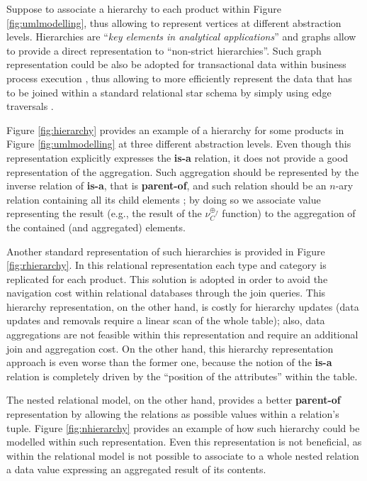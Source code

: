 \begin{example}[label=ex:inaggr]
Suppose to associate a hierarchy to each product within Figure \vref{fig:umlmodelling}, thus allowing to represent vertices at different abstraction levels. Hierarchies are ``\textit{key elements in analytical applications}'' \cite{dwbook} and graphs  allow to provide a direct representation to ``non-strict hierarchies''. Such graph representation could be also be adopted for transactional data within business process execution \cite{PterMicBergami}, thus allowing to more efficiently represent   the data that has to be joined within a standard relational star schema by simply using edge traversals  \cite{Vasilyeva13,preSQLGraph,SQLGraph}.

Figure \ref{fig:hierarchy} provides an example of a hierarchy for some products in Figure \vref{fig:umlmodelling} at three different abstraction levels. Even though this representation explicitly expresses the \textbf{is-a} relation, it does not provide a good representation of the aggregation. Such aggregation should be represented by the inverse relation of \textbf{is-a}, that is \textbf{parent-of}, and such relation should be an $n$-ary relation containing all its child elements \cite{Johnson2011}; by doing so we associate value representing the result (e.g., the result of the $\nu_C^{\oplus_f}$\index{$\nu$} function) to the aggregation of the contained (and aggregated) elements.

Another standard representation of such hierarchies is provided in Figure \ref{fig:rhierarchy}. In this relational representation  each type and category is replicated for each product. This solution is adopted in order to avoid the navigation cost within relational databases through the join queries. This hierarchy representation, on the other hand, is costly for  hierarchy updates (data updates and removals require a linear scan of the whole table); also, data aggregations are not feasible within this representation and require an additional join and aggregation cost. On the other hand, this hierarchy representation approach is even worse than the former one, because the notion of the \textbf{is-a} relation is completely driven by the ``position of the attributes'' within the table.

The nested relational model, on the other hand, provides a better \textbf{parent-of} representation by allowing the relations as possible values within a relation's tuple. Figure \ref{fig:nhierarchy} provides an example of how such hierarchy could be modelled within such representation. Even this representation is not beneficial, as within the relational model is not possible to associate to a whole nested relation a data value expressing an aggregated result of its contents.


\end{example}
